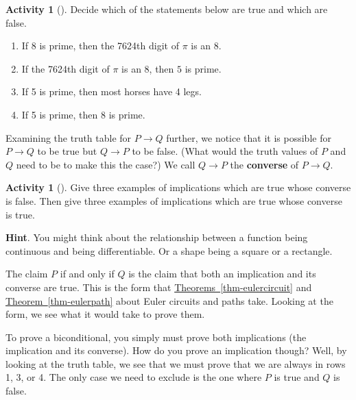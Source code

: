 \documentclass[10pt,]{book}
\newcommand{\terminology}[1]{\textbf{#1}}
\theoremstyle{plain}
\theoremstyle{definition}
\theoremstyle{definition}
\theoremstyle{definition}
\newtheorem{activity}[project]{Activity}
\numberwithin{equation}{chapter}
\def\imp{\rightarrow}
\begin{document}
\begin{activity}[]\label{activity-7}
\hypertarget{p-162}{}%
Decide which of the statements below are true and which are false.%
\begin{enumerate}[font=\bfseries,label=(\alph*),ref=\alph*]
\item\label{task-9} \hypertarget{p-163}{}%
If 8 is prime, then the 7624th digit of \(\pi\) is an 8.%
\item\label{task-10} \hypertarget{p-164}{}%
If the 7624th digit of \(\pi\) is an 8, then \(5\) is prime.%
\item\label{task-11} \hypertarget{p-165}{}%
If 5 is prime, then most horses have 4 legs.%
\item\label{task-12} \hypertarget{p-166}{}%
If 5 is prime, then 8 is prime.%
\end{enumerate}
\end{activity}
\hypertarget{p-167}{}%
Examining the truth table for \(P \imp Q\) further, we notice that it is possible for \(P \imp Q\) to be true but \(Q \imp P\) to be false. (What would the truth values of \(P\) and \(Q\) need to be to make this the case?) We call \(Q \imp P\) the \terminology{converse} of \(P \imp Q\).%
\begin{activity}[]\label{activity-8}
\hypertarget{p-168}{}%
Give three examples of implications which are true whose converse is false.  Then give three examples of implications which are true whose converse is true.%
\par\smallskip%
\noindent\textbf{Hint}.\hypertarget{hint-1}{}\quad%
\hypertarget{p-169}{}%
You might think about the relationship between a function being continuous and being differentiable.  Or a shape being a square or a rectangle.%
\end{activity}
\hypertarget{p-170}{}%
The claim \(P\) if and only if \(Q\) is the claim that both an implication and its converse are true.  This is the form that \hyperref[thm-eulercircuit]{Theorems~\ref{thm-eulercircuit}} and \hyperref[thm-eulerpath]{Theorem~\ref{thm-eulerpath}} about Euler circuits and paths take.  Looking at the form, we see what it would take to prove them.%
\par
\hypertarget{p-171}{}%
To prove a biconditional, you simply must prove both implications (the implication and its converse).  How do you prove an implication though?  Well, by looking at the truth table, we see that we must prove that we are always in rows 1, 3, or 4.  The only case we need to exclude is the one where \(P\) is true and \(Q\) is false.%
\par
\end{document}

